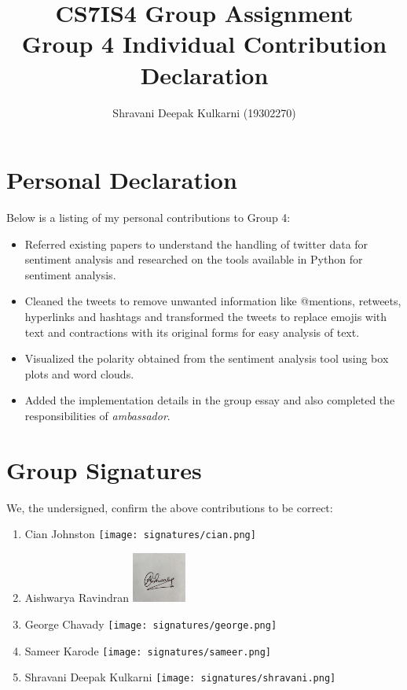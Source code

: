 \documentclass[a4paper,10pt]{article}
\begin{document}
\title{
    CS7IS4 Group Assignment \\
    \large Group 4 Individual Contribution Declaration
}
\author{
    Shravani Deepak Kulkarni (19302270)
}

\maketitle

\section{Personal Declaration}

Below is a listing of my personal contributions to Group 4:

\begin{itemize}
    \item{
    	Referred existing papers to understand the handling of twitter data for sentiment analysis and researched on the tools available in Python for sentiment analysis.
    }
    \item{
    	Cleaned the tweets to remove unwanted information like @mentions, retweets, hyperlinks and hashtags and transformed the tweets to replace emojis with text and contractions with its original forms for easy analysis of text.
	}
    \item{
    	Visualized the polarity obtained from the sentiment analysis tool using box plots and word clouds.
    }
    \item{
    	Added the implementation details in the group essay and also completed the responsibilities of \textit{ambassador}.
    }
    
\end{itemize}

\section{Group Signatures}

We, the undersigned, confirm the above contributions to be correct:

\begin{enumerate}
    \item{
        Cian Johnston \texttt{[image: signatures/cian.png]}
    }
    \item{
        Aishwarya Ravindran \includegraphics[width=0.7in]{signatures/Aishwarya.jpeg}
    }
    \item{
        George Chavady \texttt{[image: signatures/george.png]}
    }
    \item{
        Sameer Karode \texttt{[image: signatures/sameer.png]}
    }
    \item{
        Shravani Deepak Kulkarni \texttt{[image: signatures/shravani.png]}
    }

\end{enumerate}
\end{document}
